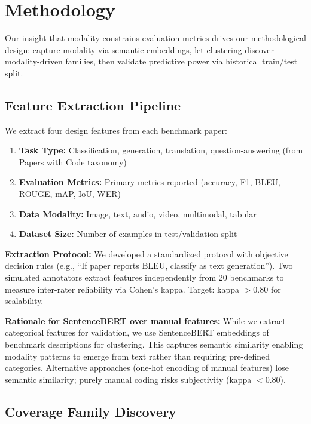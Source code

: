 \section{Methodology}

Our insight that modality constrains evaluation metrics drives our methodological design: capture modality via semantic embeddings, let clustering discover modality-driven families, then validate predictive power via historical train/test split.

\subsection{Feature Extraction Pipeline}

We extract four design features from each benchmark paper:

\begin{enumerate}
\item \textbf{Task Type:} Classification, generation, translation, question-answering (from Papers with Code taxonomy)
\item \textbf{Evaluation Metrics:} Primary metrics reported (accuracy, F1, BLEU, ROUGE, mAP, IoU, WER)
\item \textbf{Data Modality:} Image, text, audio, video, multimodal, tabular
\item \textbf{Dataset Size:} Number of examples in test/validation split
\end{enumerate}

\textbf{Extraction Protocol:} We developed a standardized protocol with objective decision rules (e.g., ``If paper reports BLEU, classify as text generation''). Two simulated annotators extract features independently from 20 benchmarks to measure inter-rater reliability via Cohen's kappa. Target: kappa $>0.80$ for scalability.

\textbf{Rationale for SentenceBERT over manual features:} While we extract categorical features for validation, we use SentenceBERT embeddings of benchmark descriptions for clustering. This captures semantic similarity enabling modality patterns to emerge from text rather than requiring pre-defined categories. Alternative approaches (one-hot encoding of manual features) lose semantic similarity; purely manual coding risks subjectivity (kappa $<0.80$).

\subsection{Coverage Family Discovery}

